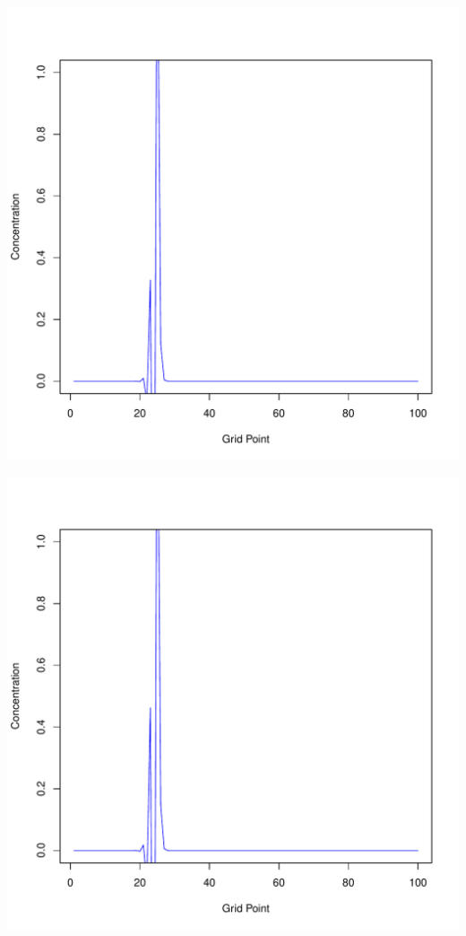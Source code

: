 \documentclass{tufte-handout}\usepackage[]{graphicx}\usepackage[]{xcolor}
\makeatletter
\def\maxwidth{ %
  \ifdim\Gin@nat@width>\linewidth
    \linewidth
  \else
    \Gin@nat@width
  \fi
}
\newenvironment{knitrout}{}{} %
\makeatother
\begin{document}
\begin{knitrout}
\includegraphics[width=\maxwidth]{figure/unnamed-chunk-1-7} 

\includegraphics[width=\maxwidth]{figure/unnamed-chunk-1-8} 


\end{knitrout}
\end{document}

